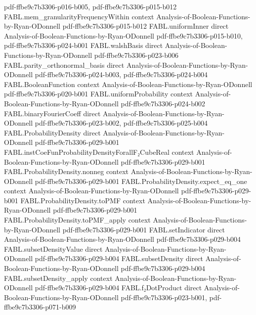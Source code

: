 \begin{theorem}
  {pdf-ffbe9c7b3306-p016-b005,
    pdf-ffbe9c7b3306-p015-b012}
\proofstep
  {FABL.mem_granularityFrequencyWithin}
  {context}
  {Analysis-of-Boolean-Functions-by-Ryan-ODonnell}
  {pdf-ffbe9c7b3306-p015-b012}
\proofstep
  {FABL.uniformInner}
  {direct}
  {Analysis-of-Boolean-Functions-by-Ryan-ODonnell}
  {pdf-ffbe9c7b3306-p015-b010,
    pdf-ffbe9c7b3306-p024-b001}
\proofstep
  {FABL.walshBasis}
  {direct}
  {Analysis-of-Boolean-Functions-by-Ryan-ODonnell}
  {pdf-ffbe9c7b3306-p023-b006}
\proofstep
  {FABL.parity_orthonormal_basis}
  {direct}
  {Analysis-of-Boolean-Functions-by-Ryan-ODonnell}
  {pdf-ffbe9c7b3306-p024-b003,
    pdf-ffbe9c7b3306-p024-b004}
\proofstep
  {FABL.BooleanFunction}
  {context}
  {Analysis-of-Boolean-Functions-by-Ryan-ODonnell}
  {pdf-ffbe9c7b3306-p020-b001}
\proofstep
  {FABL.uniformProbability}
  {context}
  {Analysis-of-Boolean-Functions-by-Ryan-ODonnell}
  {pdf-ffbe9c7b3306-p024-b002}
\proofstep
  {FABL.binaryFourierCoeff}
  {direct}
  {Analysis-of-Boolean-Functions-by-Ryan-ODonnell}
  {pdf-ffbe9c7b3306-p023-b002,
    pdf-ffbe9c7b3306-p025-b004}
\proofstep
  {FABL.ProbabilityDensity}
  {direct}
  {Analysis-of-Boolean-Functions-by-Ryan-ODonnell}
  {pdf-ffbe9c7b3306-p029-b001}
\proofstep
  {FABL.instCoeFunProbabilityDensityForallF₂CubeReal}
  {context}
  {Analysis-of-Boolean-Functions-by-Ryan-ODonnell}
  {pdf-ffbe9c7b3306-p029-b001}
\proofstep
  {FABL.ProbabilityDensity.nonneg}
  {context}
  {Analysis-of-Boolean-Functions-by-Ryan-ODonnell}
  {pdf-ffbe9c7b3306-p029-b001}
\proofstep
  {FABL.ProbabilityDensity.expect_eq_one}
  {context}
  {Analysis-of-Boolean-Functions-by-Ryan-ODonnell}
  {pdf-ffbe9c7b3306-p029-b001}
\proofstep
  {FABL.ProbabilityDensity.toPMF}
  {context}
  {Analysis-of-Boolean-Functions-by-Ryan-ODonnell}
  {pdf-ffbe9c7b3306-p029-b001}
\proofstep
  {FABL.ProbabilityDensity.toPMF_apply}
  {context}
  {Analysis-of-Boolean-Functions-by-Ryan-ODonnell}
  {pdf-ffbe9c7b3306-p029-b001}
\proofstep
  {FABL.setIndicator}
  {direct}
  {Analysis-of-Boolean-Functions-by-Ryan-ODonnell}
  {pdf-ffbe9c7b3306-p029-b004}
\proofstep
  {FABL.subsetDensityValue}
  {direct}
  {Analysis-of-Boolean-Functions-by-Ryan-ODonnell}
  {pdf-ffbe9c7b3306-p029-b004}
\proofstep
  {FABL.subsetDensity}
  {direct}
  {Analysis-of-Boolean-Functions-by-Ryan-ODonnell}
  {pdf-ffbe9c7b3306-p029-b004}
\proofstep
  {FABL.subsetDensity_apply}
  {context}
  {Analysis-of-Boolean-Functions-by-Ryan-ODonnell}
  {pdf-ffbe9c7b3306-p029-b004}
\proofstep
  {FABL.f₂DotProduct}
  {direct}
  {Analysis-of-Boolean-Functions-by-Ryan-ODonnell}
  {pdf-ffbe9c7b3306-p023-b001,
    pdf-ffbe9c7b3306-p071-b009}

\end{theorem}
